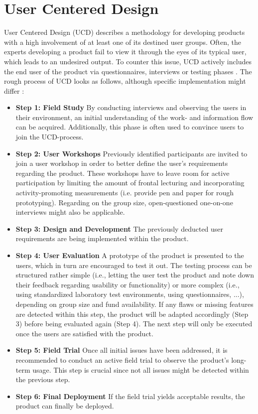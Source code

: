 \documentclass[draft,final]{vutinfth} %
\begin{document}
\section{User Centered Design}
User Centered Design (UCD) describes a methodology for developing products with a high involvement of at least one of its destined user groups. Often, the experts developing a product fail to view it through the eyes of its typical user, which leads to an undesired output. To counter this issue, UCD actively includes the end user of the product via questionnaires, interviews or testing phases \cite{9255313}. The rough process of UCD looks as follows, although specific implementation might differ \cite{7881322}:
\begin{itemize}
\item \textbf{Step 1: Field Study} By conducting interviews and observing the users in their environment, an initial understanding of the work- and information flow can be acquired. Additionally, this phase is often used to convince users to join the UCD-process.
\item \textbf{Step 2: User Workshops} Previously identified participants are invited to join a user workshop in order to better define the user's requirements regarding the product. These workshops have to leave room for active participation by limiting the amount of frontal lecturing and incorporating activity-promoting measurements (i.e. provide pen and paper for rough prototyping). Regarding on the group size, open-questioned one-on-one interviews might also be applicable.

\item \textbf{Step 3: Design and Development} The previously deducted user requirements are being implemented within the product.

\item \textbf{Step 4: User Evaluation} A prototype of the product is presented to the users, which in turn are encouraged to test it out. The testing process can be structured rather simple (i.e., letting the user test the product and note down their feedback regarding usability or functionality) or more complex (i.e., using standardized laboratory test environments, using questionnaires, ...), depending on group size and fund availability. If any flaws or missing features are detected within this step, the product will be adapted accordingly (Step 3) before being evaluated again (Step 4). The next step will only be executed once the users are satisfied with the product.

\item \textbf{Step 5: Field Trial} Once all initial issues have been addressed, it is recommended to conduct an active field trial to observe the product's long-term usage. This step is crucial since not all issues might be detected within the previous step.

\item \textbf{Step 6: Final Deployment} If the field trial yields acceptable results, the product can finally be deployed.
\end{itemize}
\end{document}

